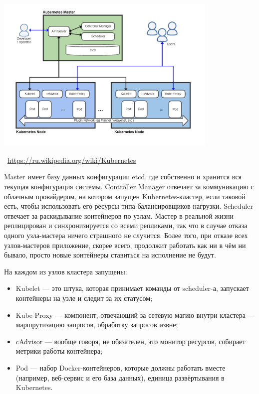 \documentclass[a5paper]{article}
\newcommand{\attribution}[1] {
    \vspace{-5mm}\begin{flushright}\begin{scriptsize}\textcolor{gray}{\textcopyright\, #1}\end{scriptsize}\end{flushright}
}
\begin{document}
\begin{center}
    \includegraphics[width=0.8\textwidth]{kubernetesArchitecture.png}
    \attribution{\url{https://ru.wikipedia.org/wiki/Kubernetes}}
\end{center}

Master имеет базу данных конфигурации etcd, где собственно и хранится вся текущая конфигурация системы. Controller Manager отвечает за коммуникацию с облачным провайдером, на котором запущен Kubernetes-кластер, если таковой есть, чтобы использовать его ресурсы типа балансировщиков нагрузки. Scheduler отвечает за раскидывание контейнеров по узлам. Мастер в реальной жизни реплицирован и синхронизируется со всеми репликами, так что в случае отказа одного узла-мастера ничего страшного не случится. Более того, при отказе всех узлов-мастеров приложение, скорее всего, продолжит работать как ни в чём ни бывало, просто новые контейнеры ставиться на исполнение не будут.

На каждом из узлов кластера запущены:

\begin{itemize}
    \item Kubelet --- это штука, которая принимает команды от scheduler-а, запускает контейнеры на узле и следит за их статусом;
    \item Kube-Proxy --- компонент, отвечающий за сетевую магию внутри кластера --- маршрутизацию запросов, обработку запросов извне;
    \item cAdvisor --- вообще говоря, не обязателен, это монитор ресурсов, собирает метрики работы контейнера;
    \item Pod --- набор Docker-контейнеров, которые должны работать вместе (например, веб-сервис и его база данных), единица развёртывания в Kubernetes.
\end{itemize}
\end{document}
